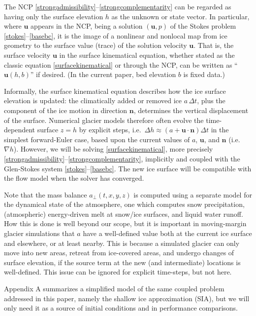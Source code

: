 \documentclass[letterpaper,final,12pt,reqno]{amsart}
\newcommand{\grad}{\nabla}
\newcommand{\bn}{\mathbf{n}}
\newcommand{\bu}{\mathbf{u}}
\begin{document}
The NCP \eqref{strongadmissibility}--\eqref{strongcomplementarity} can be regarded as having only the surface elevation $h$ as the unknown or state vector.  In particular, where $\bu$ appears in the NCP, being a solution $(\bu,p)$ of the Stokes problem \eqref{stokes}--\eqref{basebc}, it is the image of a nonlinear and nonlocal map from ice geometry to the surface value (trace) of the solution velocity $\bu$.  That is, the surface velocity $\bu$ in the surface kinematical equation, whether stated as the classic equation \eqref{surfacekinematical} or through the NCP, can be written as ``$\bu(h,b)$'' if desired.  (In the current paper, bed elevation $b$ is fixed data.)

Informally, the surface kinematical equation describes how the ice surface elevation is updated: the climatically added or removed ice $a\,\Delta t$, plus the component of the ice motion in direction $\bn$, determines the vertical displacement of the surface.  Numerical glacier models therefore often evolve the time-dependent surface $z=h$ by explicit steps, i.e.~$\Delta h \approx \left(a + \bu\cdot \bn\right) \Delta t$ in the simplest forward-Euler case, based upon the current values of $a$, $\bu$, and $\bn$ (i.e.~$\grad h$).  However, we will be solving \eqref{surfacekinematical}, more precisely \eqref{strongadmissibility}--\eqref{strongcomplementarity}, implicitly and coupled with the Glen-Stokes system \eqref{stokes}--\eqref{basebc}.  The new ice surface will be compatible with the flow model when the solver has converged.

Note that the mass balance $a_{\perp}(t,x,y,z)$ is computed using a separate model for the dynamical state of the atmosphere, one which computes snow precipitation, (atmospheric) energy-driven melt at snow/ice surfaces, and liquid water runoff.  How this is done is well beyond our scope, but it is important in moving-margin glacier simulations that $a$ have a well-defined value both at the current ice surface and elsewhere, or at least nearby.  This is because a simulated glacier can only move into new areas, retreat from ice-covered areas, and undergo changes of surface elevation, if the source term at the new (and intermediate) locations is well-defined.  This issue can be ignored for explicit time-steps, but not here.

Appendix A summarizes a simplified model of the same coupled problem addressed in this paper, namely the shallow ice approximation (SIA), but we will only need it as a source of initial conditions and in performance comparisons.
\end{document}
